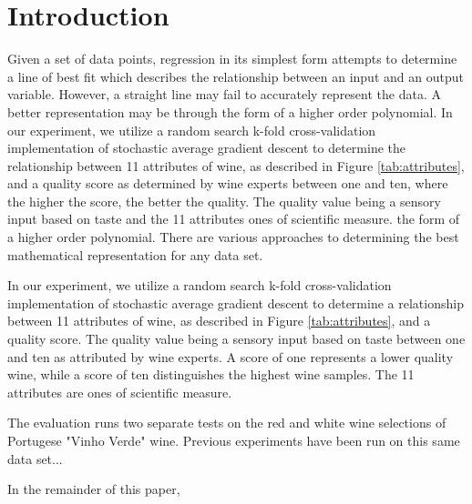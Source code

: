 
\section{Introduction}
\label{sec:intro}

Given a set of data points, regression in its simplest form attempts to 
determine a line of best fit which describes the relationship between an
input and an output variable. However, a straight line may fail to
accurately represent the data. A better representation may be through
the form of a higher order polynomial. In our experiment, we utilize
a random search k-fold cross-validation implementation of stochastic
average gradient descent to determine the relationship between 11 attributes of wine,
as described in Figure \ref{tab:attributes}, and a quality score as determined by wine experts
between one and ten, where the higher the score, the better the quality.
The quality value being a sensory input based on taste
and the 11 attributes ones of scientific measure.
the form of a higher order polynomial. There are various approaches 
to determining the best mathematical representation for any data set.

In our experiment, we utilize a random search k-fold cross-validation implementation of stochastic
average gradient descent to determine a relationship between 11 attributes of wine,
as described in Figure \ref{tab:attributes}, and a quality score. The quality value being a sensory input based on taste between one and ten as attributed by wine experts. A score of one represents a lower quality wine, while a score of ten distinguishes the highest wine samples. The 11 attributes are ones of scientific measure.

The evaluation runs two separate tests on the red and white wine 
selections of Portugese "Vinho Verde" wine. Previous experiments 
have been run on this same data set...

In the remainder of this paper, 




